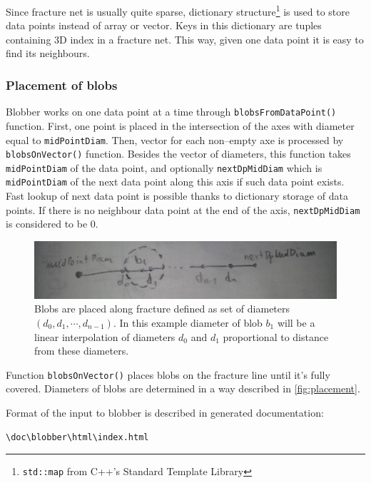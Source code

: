 Since fracture net is usually quite sparse, dictionary structure\footnote{\texttt{std::map} from C++'s Standard Template Library}
is used to store data points instead of array or vector. Keys in this dictionary
are tuples containing 3D index in a fracture net. This way, given one data point
it is easy to find its neighbours.

\subsubsection{Placement of blobs}

Blobber works on one data point at a time through \texttt{blobs\-From\-Data\-Point()}
function. First, one point is placed in the intersection of the axes with
diameter equal to \texttt{mid\-Point\-Diam}. Then, vector for each non--empty
axe is processed by \texttt{blobsOnVector()} function. Besides the vector of
diameters, this function takes \texttt{midPointDiam} of the data point, and optionally
\texttt{nextDpMidDiam} which is \texttt{midPointDiam} of the next data point
along this axis if such data point exists. Fast lookup of next data point
is possible thanks to dictionary storage of data points. If there is no neighbour data
point at the end of the axis, \texttt{nextDpMidDiam} is considered to be 0.

\begin{figure}[htb]
  \begin{center}
    \includegraphics[width=\textwidth]{chapters/project/placement.jpg}
  \end{center}
  \caption{Blobs are placed along fracture defined as set of diameters
    $(d_0,d_1,\cdots,d_{n-1})$. In this example diameter of blob $b_1$ will be a
    linear interpolation of diameters $d_0$ and $d_1$ proportional to distance
    from these diameters.}
  \label{fig:placement}
\end{figure}

Function \texttt{blobsOnVector()} places blobs on the fracture line until
it's fully covered. Diameters of blobs are determined in a way described
in \autoref{fig:placement}.

Format of the input to blobber is described in generated documentation:
\begin{lstlisting}[language=bash,numbers=none]
\doc\blobber\html\index.html
\end{lstlisting}

